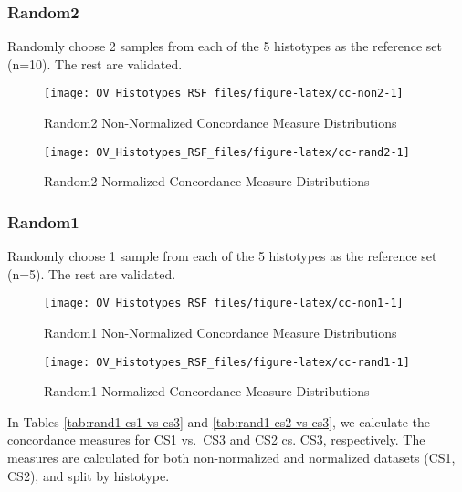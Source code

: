 \documentclass[
]{report}
\begin{document}
\hypertarget{random2}{%
\subsubsection{Random2}\label{random2}}

Randomly choose 2 samples from each of the 5 histotypes as the reference set (n=10). The rest are validated.

\begin{figure}[H]

{\centering \texttt{[image: OV\_Histotypes\_RSF\_files/figure-latex/cc-non2-1]} 

}

\caption{Random2 Non-Normalized Concordance Measure Distributions}\label{fig:cc-non2}
\end{figure}

\begin{figure}[H]

{\centering \texttt{[image: OV\_Histotypes\_RSF\_files/figure-latex/cc-rand2-1]} 

}

\caption{Random2 Normalized Concordance Measure Distributions}\label{fig:cc-rand2}
\end{figure}

\hypertarget{random1}{%
\subsubsection{Random1}\label{random1}}

Randomly choose 1 sample from each of the 5 histotypes as the reference set (n=5). The rest are validated.

\begin{figure}[H]

{\centering \texttt{[image: OV\_Histotypes\_RSF\_files/figure-latex/cc-non1-1]} 

}

\caption{Random1 Non-Normalized Concordance Measure Distributions}\label{fig:cc-non1}
\end{figure}

\begin{figure}[H]

{\centering \texttt{[image: OV\_Histotypes\_RSF\_files/figure-latex/cc-rand1-1]} 

}

\caption{Random1 Normalized Concordance Measure Distributions}\label{fig:cc-rand1}
\end{figure}

In Tables \ref{tab:rand1-cs1-vs-cs3} and \ref{tab:rand1-cs2-vs-cs3}, we calculate the concordance measures for CS1 vs.~CS3 and CS2 cs. CS3, respectively. The measures are calculated for both non-normalized and normalized datasets (CS1, CS2), and split by histotype.
\end{document}
